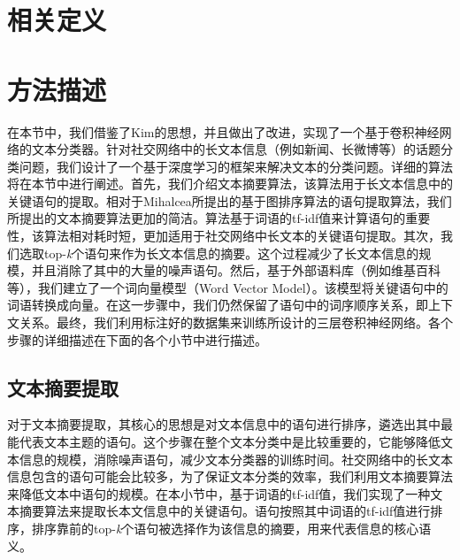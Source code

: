 \section{相关定义}
\label{sec3:definition}

\section{方法描述}
\label{sec3:method}
在本节中，我们借鉴了Kim的思想，并且做出了改进，实现了一个基于卷积神经网络的文本分类器。针对社交网络中的长文本信息（例如新闻、长微博等）的话题分类问题，我们设计了一个基于深度学习的框架来解决文本的分类问题。详细的算法将在本节中进行阐述。首先，我们介绍文本摘要算法，该算法用于长文本信息中的关键语句的提取。相对于Mihalcea所提出的基于图排序算法的语句提取算法，我们所提出的文本摘要算法更加的简洁。算法基于词语的tf-idf值来计算语句的重要性，该算法相对耗时短，更加适用于社交网络中长文本的关键语句提取。其次，我们选取top-\textit{k}个语句来作为长文本信息的摘要。这个过程减少了长文本信息的规模，并且消除了其中的大量的噪声语句。然后，基于外部语料库（例如维基百科等），我们建立了一个词向量模型（Word Vector Model）。该模型将关键语句中的词语转换成向量。在这一步骤中，我们仍然保留了语句中的词序顺序关系，即上下文关系。最终，我们利用标注好的数据集来训练所设计的三层卷积神经网络。各个步骤的详细描述在下面的各个小节中进行描述。

\subsection{文本摘要提取}
\label{subsec3:abstactExtract}
对于文本摘要提取，其核心的思想是对文本信息中的语句进行排序，遴选出其中最能代表文本主题的语句。这个步骤在整个文本分类中是比较重要的，它能够降低文本信息的规模，消除噪声语句，减少文本分类器的训练时间。社交网络中的长文本信息包含的语句可能会比较多，为了保证文本分类的效率，我们利用文本摘要算法来降低文本中语句的规模。在本小节中，基于词语的tf-idf值，我们实现了一种文本摘要算法来提取长本文信息中的关键语句。语句按照其中词语的tf-idf值进行排序，排序靠前的top-\textit{k}个语句被选择作为该信息的摘要，用来代表信息的核心语义。

